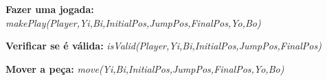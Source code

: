 \documentclass[a4paper]{article}
\begin{document}
\begin{flushleft} 
\hspace{5mm} \textbf{Fazer uma jogada:}\linebreak
\textit {makePlay(Player,Yi,Bi,InitialPos,JumpPos,FinalPos,Yo,Bo)}\linebreak

\hspace{5mm} \textbf{Verificar se é válida:}\linebreak
\textit{isValid(Player,Yi,Bi,InitialPos,JumpPos,FinalPos)}\linebreak

\hspace{5mm} \textbf{Mover a peça:}\linebreak
\textit{move(Yi,Bi,InitialPos,JumpPos,FinalPos,Yo,Bo)}\linebreak
\end{flushleft}
\end{document}
